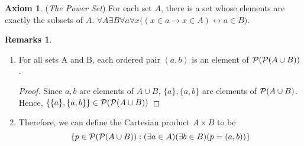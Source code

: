 \documentclass[14pt]{article}
\theoremstyle{definition}
\newtheorem*{remark}{Remarks}
\newtheorem{axiom}[definition]{Axiom}
\begin{document}
\begin{axiom}
    (\textit{The Power Set}) For each set $A$, there is a set whose elements are exactly the subsets of $A$. $\forall A \exists B \forall a\forall x\big((x\in a\rightarrow x\in A)\leftrightarrow a\in B\big)$.
\end{axiom}
\begin{remark}
\hfill
\begin{enumerate}
    \item  For all sets A and B, each ordered pair $(a,b)$ is an element of  ${\cal {P}}({\cal {P}}(A\cup B))$ . 
    \begin{proof}
        Since $a,b$ are elements of $A\cup B$,  $\{a\},\{a,b\}$ are elements of  ${\cal P}(A \cup B)$. Hence,  $\{\{a\},\{a,b\}\}\in{\cal {P}}({\cal {P}}(A\cup B))$
    \end{proof}   
    \item Therefore, we can define the Cartesian product $A\times B$ to be 
    \begin{equation*}
        \{p\in {\cal {P}}({\cal {P}}(A\cup B)) :(\exists a\in A)(\exists b\in B)(p=(a,b))\}
    \end{equation*}
\end{enumerate}


\end{remark}

\vspace{2mm}
\end{document}
